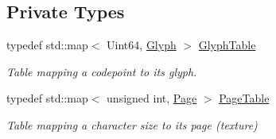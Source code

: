 \subsection*{Private Types}
\begin{DoxyCompactItemize}
\item 
\mbox{\label{classsf_1_1_font_a952841b9f01447562e2cd9c6e41d3a58}} 
typedef std\+::map$<$ Uint64, \mbox{\hyperlink{classsf_1_1_glyph}{Glyph}} $>$ \mbox{\hyperlink{classsf_1_1_font_a952841b9f01447562e2cd9c6e41d3a58}{Glyph\+Table}}
\begin{DoxyCompactList}\small\item\em Table mapping a codepoint to its glyph. \end{DoxyCompactList}\item 
\mbox{\label{classsf_1_1_font_a1aca3fb29fc050f48949610be1f40a05}} 
typedef std\+::map$<$ unsigned int, \mbox{\hyperlink{structsf_1_1_font_1_1_page}{Page}} $>$ \mbox{\hyperlink{classsf_1_1_font_a1aca3fb29fc050f48949610be1f40a05}{Page\+Table}}
\begin{DoxyCompactList}\small\item\em Table mapping a character size to its page (texture) \end{DoxyCompactList}\end{DoxyCompactItemize}
